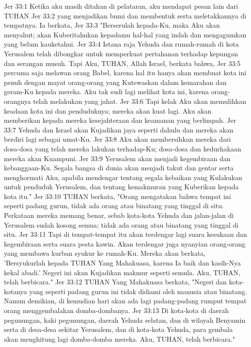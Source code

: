 Jer 33:1  Ketika aku masih ditahan di pelataran, aku mendapat pesan lain dari TUHAN
Jer 33:2  yang menjadikan bumi dan membentuk serta meletakkannya di tempatnya. Ia berkata,
Jer 33:3  "Berserulah kepada-Ku, maka Aku akan menyahut; akan Kuberitahukan kepadamu hal-hal yang indah dan mengagumkan yang belum kauketahui.
Jer 33:4  Istana raja Yehuda dan rumah-rumah di kota Yerusalem telah dibongkar untuk memperkuat pertahanan terhadap kepungan dan serangan musuh. Tapi Aku, TUHAN, Allah Israel, berkata bahwa,
Jer 33:5  percuma saja melawan orang Babel, karena hal itu hanya akan membuat kota ini penuh dengan mayat orang-orang yang Kutewaskan dalam kemarahan dan geram-Ku kepada mereka. Aku tak sudi lagi melihat kota ini, karena orang-orangnya telah melakukan yang jahat.
Jer 33:6  Tapi kelak Aku akan memulihkan keadaan kota ini dan penduduknya; mereka akan kuat lagi. Aku akan memberikan kepada mereka kesejahteraan dan keamanan yang berlimpah.
Jer 33:7  Yehuda dan Israel akan Kujadikan jaya seperti dahulu dan mereka akan berdiri lagi sebagai umat-Ku.
Jer 33:8  Aku akan membersihkan mereka dari dosa-dosa yang telah mereka lakukan terhadap-Ku; dosa-dosa dan kedurhakaan mereka akan Kuampuni.
Jer 33:9  Yerusalem akan menjadi kegembiraan dan kebanggaan-Ku. Segala bangsa di dunia akan menjadi takut dan gentar serta menghormati Aku, apabila mendengar tentang segala kebaikan yang Kulakukan untuk penduduk Yerusalem, dan tentang kemakmuran yang Kuberikan kepada kota itu."
Jer 33:10  TUHAN berkata, "Orang mengatakan bahwa tempat ini seperti padang gurun, tidak ada orang atau binatang yang tinggal di situ. Perkataan mereka memang benar, sebab kota-kota Yehuda dan jalan-jalan di Yerusalem sudah kosong semua; tidak ada orang atau binatang yang tinggal di situ.
Jer 33:11  Tapi di tempat-tempat itu akan terdengar lagi suara kesukaan dan kegembiraan serta suara pesta kawin. Akan terdengar juga nyanyian orang-orang yang membawa kurban syukur ke rumah-Ku. Mereka akan berkata, 'Bersyukurlah kepada TUHAN Yang Mahakuasa, karena Ia baik dan kasih-Nya kekal abadi.' Negeri ini akan Kujadikan makmur seperti semula. Aku, TUHAN, telah berbicara."
Jer 33:12  TUHAN Yang Mahakuasa berkata, "Negeri dan kota-kotanya yang seperti padang gurun ini tidak didiami oleh manusia atau binatang. Namun demikian, di kemudian hari akan ada lagi padang-padang rumput tempat orang menggembalakan domba-dombanya.
Jer 33:13  Di kota-kota di daerah pegunungan, kaki pegunungan, daerah Yehuda selatan, dan di wilayah Benyamin serta di desa-desa sekitar Yerusalem, dan di kota-kota Yehuda, para gembala akan menghitung lagi domba-domba mereka. Aku, TUHAN, telah berbicara."
